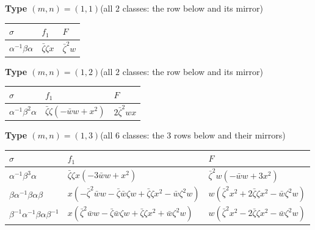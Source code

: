 \par\medskip\noindent\textbf{Type $(m,n)=(1,1)$}\quad (all $2$ classes: the row below and its mirror)
\par\nopagebreak\smallskip\noindent
{\small\begin{tabular}{@{}lll@{}}
\hline
$\sigma$ & $f_1$ & $F$ \\
\hline
$\alpha^{-1}\beta\alpha$ & $\bar{\zeta} \zeta x$ & $\bar{\zeta}^{2} w$ \\[2pt]
\hline
\end{tabular}}

\par\medskip\noindent\textbf{Type $(m,n)=(1,2)$}\quad (all $2$ classes: the row below and its mirror)
\par\nopagebreak\smallskip\noindent
{\small\begin{tabular}{@{}lll@{}}
\hline
$\sigma$ & $f_1$ & $F$ \\
\hline
$\alpha^{-1}\beta^{2}\alpha$ & $\bar{\zeta} \zeta \left(- \bar{w} w + x^{2}\right)$ & $2 \bar{\zeta}^{2} w x$ \\[2pt]
\hline
\end{tabular}}

\par\medskip\noindent\textbf{Type $(m,n)=(1,3)$}\quad (all $6$ classes: the $3$ rows below and their mirrors)
\par\nopagebreak\smallskip\noindent
{\small\begin{tabular}{@{}lll@{}}
\hline
$\sigma$ & $f_1$ & $F$ \\
\hline
$\alpha^{-1}\beta^{3}\alpha$ & $\bar{\zeta} \zeta x \left(- 3 \bar{w} w + x^{2}\right)$ & $\bar{\zeta}^{2} w \left(- \bar{w} w + 3 x^{2}\right)$ \\[2pt]
$\beta\alpha^{-1}\beta\alpha\beta$ & $x \left(- \bar{\zeta}^{2} \bar{w} w - \bar{\zeta} \bar{w} \zeta w + \bar{\zeta} \zeta x^{2} - \bar{w} \zeta^{2} w\right)$ & $w \left(\bar{\zeta}^{2} x^{2} + 2 \bar{\zeta} \zeta x^{2} - \bar{w} \zeta^{2} w\right)$ \\[2pt]
$\beta^{-1}\alpha^{-1}\beta\alpha\beta^{-1}$ & $x \left(\bar{\zeta}^{2} \bar{w} w - \bar{\zeta} \bar{w} \zeta w + \bar{\zeta} \zeta x^{2} + \bar{w} \zeta^{2} w\right)$ & $w \left(\bar{\zeta}^{2} x^{2} - 2 \bar{\zeta} \zeta x^{2} - \bar{w} \zeta^{2} w\right)$ \\[2pt]
\hline
\end{tabular}}


